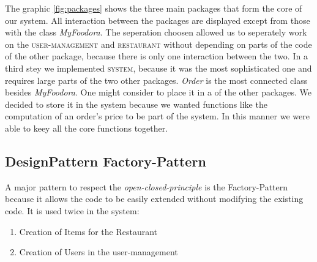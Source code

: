The graphic \ref{fig:packages} shows the three main packages that form the core of our system. All
interaction between the packages are displayed except from those with the class \textit{MyFoodora}.
The seperation choosen allowed us to seperately work on the \textsc{user-management} and
\textsc{restaurant} without depending on parts of the code of the other package, because there is 
only one interaction between the two. In a third stey we implemented \textsc{system}, because it was
the most sophisticated one and requires large parts of the two other packages. \textit{Order} is the most connected class besides \textit{MyFoodora}. One might consider to place it in a of the other 
packages. We decided to store it in the system because we wanted functions like the computation of 
an order's price to be part of the system. In this manner we were able to keey all the core functions
together. 

\subsection{DesignPattern Factory-Pattern}
\label{sub:designpattern_factory_pattern}

A major pattern to respect the \textit{open-closed-principle} is the Factory-Pattern because it 
allows the code to be easily extended without modifying the existing code. It is used twice in the
system:
\begin{enumerate}
	\item Creation of Items for the Restaurant
	\item Creation of Users in the user-management
\end{enumerate}
